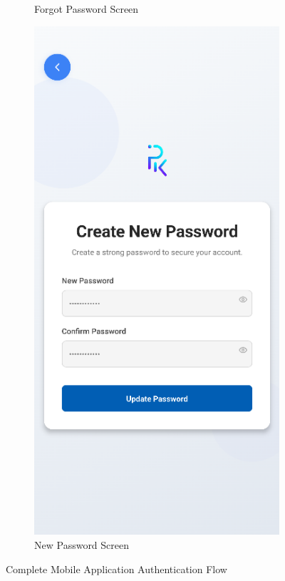 \begin{figure}[htbp]
\begin{subfigure}[b]{0.3\textwidth}
        \caption{Forgot Password Screen}
        \label{fig:mobile-forgot-password}
    \end{subfigure}
    \hfill
    \begin{subfigure}[b]{0.3\textwidth}
        \centering
        \includegraphics[width=\textwidth]{images/mobile-auth-screen_newpassword.png}
        \caption{New Password Screen}
        \label{fig:mobile-new-password}
    \end{subfigure}
    \caption{Complete Mobile Application Authentication Flow}
    \label{fig:mobile-auth-interfaces}
\end{figure}

